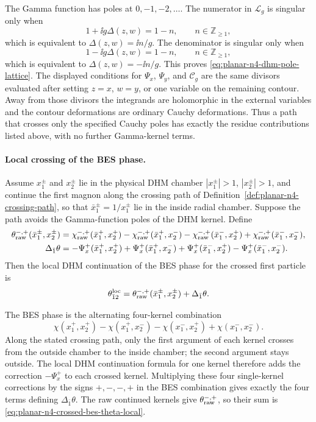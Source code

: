 The Gamma function has poles at \(0,-1,-2,\ldots\).  The numerator in
\(\mathcal L_g\) is singular only when
\[
  1+\ii g\Delta(z,w)=1-n,\qquad n\in\mathbb Z_{\ge1},
\]
which is equivalent to \(\Delta(z,w)=\ii n/g\).  The denominator is singular
only when
\[
  1-\ii g\Delta(z,w)=1-n,\qquad n\in\mathbb Z_{\ge1},
\]
which is equivalent to \(\Delta(z,w)=-\ii n/g\).  This proves
\eqref{eq:planar-n4-dhm-pole-lattice}.  The displayed conditions for
\(\Psi_x\), \(\Psi_y\), and \(\mathcal C_g\) are the same divisors evaluated
after setting \(z=x\), \(w=y\), or one variable on the remaining contour.
Away from those divisors the integrands are holomorphic in the external
variables and the contour deformations are ordinary Cauchy deformations.
Thus a path that crosses only the specified Cauchy poles has exactly the
residue contributions listed above, with no further Gamma-kernel terms.

\paragraph{Local crossing of the BES phase.}
Assume \(x_1^\pm\) and \(x_2^\pm\) lie in the physical DHM chamber
\(|x_1^\pm|>1\), \(|x_2^\pm|>1\), and continue the first magnon along the
crossing path of Definition~\ref{def:planar-n4-crossing-path}, so that
\(\bar x_1^\pm=1/x_1^\pm\) lie in the inside radial chamber.  Suppose the
path avoids the Gamma-function poles of the DHM kernel.  Define
\begin{equation}
\begin{aligned}
  \theta_{\rm raw}^{-,+}(\bar x_1^\pm,x_2^\pm)
  &=
  \chi_{\rm raw}^{-,+}(\bar x_1^+,x_2^+)
  -\chi_{\rm raw}^{-,+}(\bar x_1^+,x_2^-)
  -\chi_{\rm raw}^{-,+}(\bar x_1^-,x_2^+)
  +\chi_{\rm raw}^{-,+}(\bar x_1^-,x_2^-),\\
  \Delta_{\bar1}\theta
  &=
  -\Psi_x^{+}(\bar x_1^+,x_2^+)
  +\Psi_x^{+}(\bar x_1^+,x_2^-)
  +\Psi_x^{+}(\bar x_1^-,x_2^+)
  -\Psi_x^{+}(\bar x_1^-,x_2^-).
\end{aligned}
  \label{eq:planar-n4-crossed-bes-theta-local-residue}
\end{equation}
Then the local DHM continuation of the BES phase for the crossed first
particle is
\begin{equation}
  \theta_{\bar1 2}^{\rm loc}
  =
  \theta_{\rm raw}^{-,+}(\bar x_1^\pm,x_2^\pm)
  +
  \Delta_{\bar1}\theta .
  \label{eq:planar-n4-crossed-bes-theta-local}
\end{equation}

The BES phase is the alternating four-kernel combination
\[
  \chi(x_1^+,x_2^+)-\chi(x_1^+,x_2^-)
  -\chi(x_1^-,x_2^+)+\chi(x_1^-,x_2^-).
\]
Along the stated crossing path, only the first argument of each kernel crosses
from the outside chamber to the inside chamber; the second argument stays
outside.  The local DHM continuation formula for one kernel therefore adds
the correction \(-\Psi_x^+\) to each crossed kernel.  Multiplying these four
single-kernel corrections by the signs \(+,-,-,+\) in the BES combination
gives exactly the four terms defining \(\Delta_{\bar1}\theta\).  The raw
continued kernels give \(\theta_{\rm raw}^{-,+}\), so their sum is
\eqref{eq:planar-n4-crossed-bes-theta-local}.

